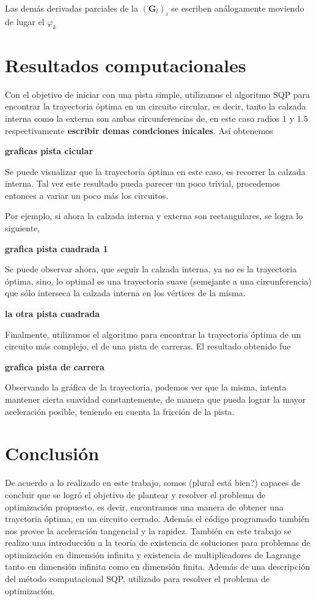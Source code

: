 \documentclass[a4paper,10pt]{book}
\newcounter{ejem}[section]
\begin{document}
Las demás derivadas parciales de la $(\textbf{G}_l)_i$ se escriben análogamente moviendo de lugar el $\varphi_k$



\chapter{Resultados computacionales}

Con el objetivo de iniciar con una pista simple, utilizamos el algoritmo SQP para encontrar la trayectoria óptima en un circuito circular, es decir, tanto la calzada interna como la externa son ambas circunferencias de, en este caso radios $1$ y $1.5$ respectivamente \textbf{escribir demas condciones inicales}. Así obtenemos

\textbf{graficas pista cicular}

Se puede visualizar que la trayectoria óptima en este caso, es recorrer la calzada interna. Tal vez este resultado pueda parecer un poco trivial, procedemos entonces a variar un poco más los circuitos.

Por ejemplo, si ahora la calzada interna y externa son rectangulares, se logra lo siguiente,

\textbf{grafica pista cuadrada 1}

Se puede observar ahora, que seguir la calzada interna, ya no es la trayectoria óptima, sino, lo optimal es una trayectoria suave (semejante a una circunferencia) que sólo interseca la calzada interna en los vértices de la misma.

\textbf{la otra pista cuadrada}

Finalmente, utilizamos el algoritmo para encontrar la trayectoria óptima de un circuito más complejo, el de una pista de carreras. El resultado obtenido fue

\textbf{grafica pista de carrera}

Observando la gráfica de la trayectoria, podemos ver que la misma, intenta mantener cierta suavidad constantemente, de manera que pueda lograr la mayor aceleración posible, teniendo en cuenta la fricción de la pista.

\chapter{Conclusión}

De acuerdo a lo realizado en este trabajo, somos (plural está bien?) capaces de concluir que se logró el objetivo de plantear y resolver el problema de optimización propuesto, es decir, encontramos una manera de obtener una trayctoria óptima, en un circuito cerrado. Además el código programado también nos provee la aceleración tangencial y la rapidez. También en este trabajo se realizo una introducción a la teoría de existencia de soluciones para problemas de optimización en dimensión infinita y existencia de multiplicadores de Lagrange tanto en dimensión infinita como en dimensión finita. Además de una descripción del método computacional SQP, utilizado para resolver el problema de optimización.
\end{document}
